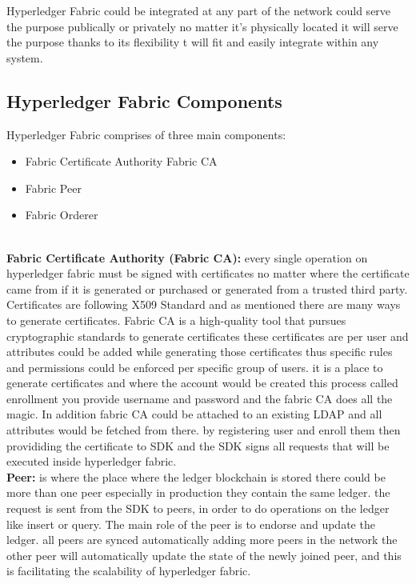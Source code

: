 Hyperledger Fabric could be integrated at any part of the network could serve the purpose publically or privately no matter it's physically located it will serve the purpose thanks to its flexibility t will fit and easily integrate within any system. \\ 


\subsection{Hyperledger Fabric Components} 

Hyperledger Fabric comprises of three main components:
\begin{itemize}
  \item Fabric Certificate Authority Fabric CA 
  \item Fabric Peer 
  \item Fabric Orderer 
\end{itemize} 

\\

\textbf{ Fabric Certificate Authority (Fabric CA):} every single operation on hyperledger fabric must be signed with certificates no matter where the certificate came from if it is generated or purchased or generated from a trusted third party. Certificates are following X509 Standard and as mentioned there are many ways to generate certificates.
Fabric CA is a high-quality tool that pursues cryptographic standards to generate certificates these certificates are per user and attributes could be added while generating those certificates thus specific rules and permissions could be enforced per specific group of users. it is a place to generate certificates and  where the account would be created this process called enrollment you provide username and password and the fabric CA does all the magic. 
In addition fabric CA could be attached to an existing LDAP and all attributes would be fetched from there. 
by registering user and enroll them then provididing the certificate to SDK and the SDK signs all requests that will be executed inside hyperledger fabric. \\ 

\textbf{Peer:} is where the place where the ledger blockchain is stored there could be more than one peer especially in production they contain the same ledger.  the request is sent from the SDK to peers, in order to do operations on the ledger like insert or query.  The main role of the peer is to endorse and update the ledger. all peers are synced automatically adding more peers in the network the other peer will automatically update the state of the newly joined peer, and this is facilitating the scalability of hyperledger fabric.  \\ 

